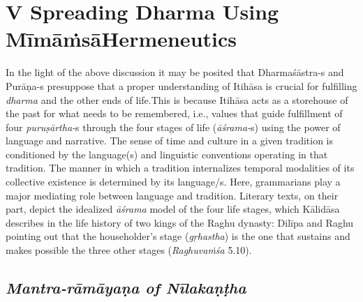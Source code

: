 \section*{V Spreading Dharma Using Mīmāṁsā\hfill \break Hermeneutics}

In the light of the above discussion it may be posited that Dharmaśāstra-s and Purāṇa-s presuppose that a proper understanding of Itihāsa is crucial for fulfilling \textit{dharma} and the other ends of life.This is because Itihāsa acts as a storehouse of the past for what needs to be remembered, i.e., values that guide fulfillment of four \textit{puruṣārtha-}s through the four stages of life (\textit{āśrama-}s) using the power of language and narrative. The sense of time and culture in a given tradition is conditioned by the language(s) and linguistic conventions operating in that tradition. The manner in which a tradition internalizes temporal modalities of its collective existence is determined by its language/s. Here, grammarians play a major mediating role between language and tradition. Literary texts, on their part, depict the idealized \textit{āśrama} model of the four life stages, which Kālidāsa describes in the life history of two kings of the Raghu dynasty: Dilīpa and Raghu pointing out that the householder’s stage (\textit{gṛhastha}) is the one that sustains and makes possible the three other stages (\textit{Raghuvaṁśa} 5.10).

\newpage

\subsection*{\textit{Mantra-rāmāyaṇa of Nīlakaṇṭha}}

